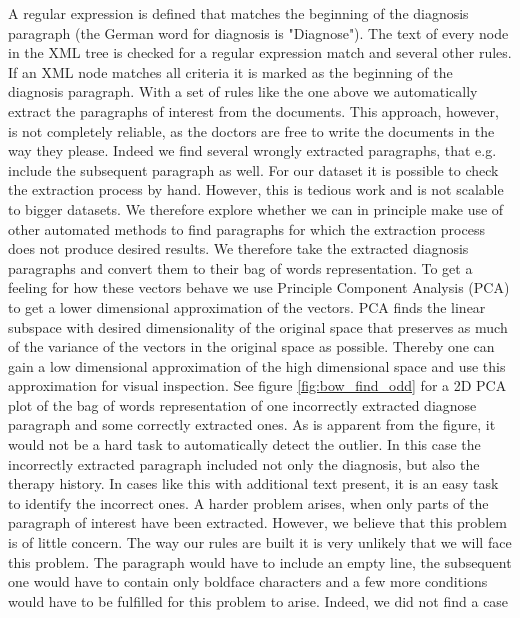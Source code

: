\bigskip

A regular expression is defined that matches the beginning of the diagnosis paragraph (the German word for diagnosis is "Diagnose").
The text of every node in the XML tree is checked for a regular expression match and several other rules. If an XML node matches all criteria it is marked as the beginning of the diagnosis paragraph.
With a set of rules like the one above we automatically extract the
paragraphs of interest from the documents. This approach, however,
is not completely reliable, as the doctors are free to write the documents
in the way they please. Indeed we find several wrongly extracted paragraphs,
that e.g. include the subsequent paragraph as well. For our dataset
it is possible to check the extraction process by hand. However, this
is tedious work and is not scalable to bigger
datasets. We therefore explore whether we can in principle make use
of other automated methods to find paragraphs for which the extraction
process does not produce desired results. We therefore take the extracted
diagnosis paragraphs and convert them to their bag of words representation.
To get a feeling for how these vectors behave we use Principle Component
Analysis (PCA) to get a lower dimensional approximation of the vectors. PCA finds the linear
subspace with desired dimensionality of the original space that preserves as much of the variance of the vectors in the original space as possible. Thereby one can gain a low dimensional approximation of the high dimensional space and use this approximation for visual inspection.
See figure \ref{fig:bow_find_odd} for a 2D PCA plot of the bag of words representation
of one incorrectly extracted diagnose paragraph and some correctly
extracted ones. As is apparent from the figure, it would not be a
hard task to automatically detect the outlier. In this case the incorrectly
extracted paragraph included not only the diagnosis, but also the
therapy history. In cases like this with additional text present, it is an easy task to
identify the incorrect ones. A harder problem arises, when only parts
of the paragraph of interest have been extracted. However, we believe
that this problem is of little concern. The way our rules are built it
is very unlikely that we will face this problem. The paragraph would
have to include an empty line, the subsequent one would have to contain
only boldface characters and a few more conditions would have to be
fulfilled for this problem to arise. Indeed, we did not find a case
